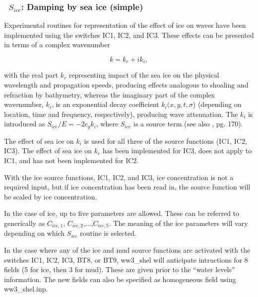 \vsssub
\subsubsection{~$S_{ice}$: Damping by sea ice (simple)} \label{sec:ICE1}
\vsssub


\noindent
Experimental routines for representation of the effect of ice on waves have
been implemented using the switches {\code IC1}, {\code IC2}, and {\code
IC3}. These effects can be presented in terms of a complex wavenumber

\begin{equation}\label{eq:waveno}
     {k} = {k_r} + i{k_i},
\end{equation}

\noindent
with the real part ${k_r}$ representing impact of the sea ice on the physical
wavelength and propagation speeds, producing effects analogous to shoaling and
refraction by bathymetry, whereas the imaginary part of the complex
wavenumber, ${k_i}$, is an exponential decay coefficient
${k_i}({x},{y},{t},\sigma $) (depending on location, time and frequency,
respectively), producing wave attenuation.  The ${k_i}$ is introduced as
${S_{ice}}/{E}=-2{c_g}{k_i}$, where ${S_{ice}}$ is a source term (see also
\cite{bk:WAM94}, pg. 170).

The effect of sea ice on ${k_i}$ is used for all three of the source functions
({\code IC1}, {\code IC2}, {\code IC3}). The effect of sea ice on ${k_r}$ has
been implemented for {\code IC3}, does
not apply to {\code IC1}, and has not been implemented for {\code IC2}.

With the ice source functions, {\code IC1}, {\code IC2}, and {\code IC3}, ice
concentration is not a required input, but if ice concentration has been read
in, the source function will be scaled by ice concentration.

In the case of ice, up to five parameters are allowed. These can be referred
to generically as ${C_{ice,1}}$, ${C_{ice,2}}$,...,${C_{ice,5}}$.  The meaning
of the ice parameters will vary depending on which ${S_{ice}}$ routine is
selected.

In the case where any of the ice and mud source functions are activated with
the switches {\code IC1}, {\code IC2}, {\code IC3}, {\code BT8}, or {\code
BT9}, {\file ww3\_shel} will anticipate intructions for 8 fields (5 for ice,
then 3 for mud). These are given prior to the ``water levels'' information.
The new fields can also be specified as homogeneous field using {\file
ww3\_shel.inp}.

